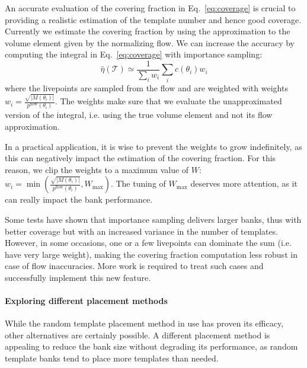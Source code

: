 \documentclass[twocolumn,showpacs,preprintnumbers,nofootinbib,prd,
superscriptaddress,10pt]{revtex4-2}
\begin{document}
An accurate evaluation of the covering fraction in Eq.~\eqref{eq:coverage} is crucial to providing a realistic estimation of the template number and hence good coverage.
Currently we estimate the covering fraction by using the approximation to the volume element given by the normalizing flow.
We can increase the accuracy by computing the integral in  Eq.~\eqref{eq:coverage} with importance sampling:
\begin{equation}\label{eq:coverage_estimate_IS}
	\hat{\eta}(\mathcal{T}) \simeq \frac{1}{\sum_i w_i} \sum_i c(\theta_i) w_i 
\end{equation}
where the livepoints are sampled from the flow and are weighted with weights $w_i = \frac{\sqrt{|M(\theta_i)|}}{p^\text{flow}(\theta_i)}$.
The weights make sure that we evaluate the unapproximated version of the integral, i.e. using the true volume element and not its flow approximation.

In a practical application, it is wise to prevent the weights to grow indefinitely, as this can negatively impact the estimation of the covering fraction. For this reason, we clip the weights to a maximum value of $W$: ${w_i = \min\left(\frac{\sqrt{|M(\theta_i)|}}{p^\text{flow}(\theta_i)}, W_\text{max} \right)}$. The tuning of $W_\text{max}$ deserves more attention, as it can really impact the bank performance.

Some tests have shown that importance sampling delivers larger banks, thus with better coverage but with an increased variance in the number of templates. However, in some occasions, one or a few livepoints can dominate the sum (i.e. have very large weight), making the covering fraction computation less robust in case of flow inaccuracies.
More work is required to treat such cases and successfully implement this new feature.


\paragraph{Exploring different placement methods}

While the random template placement method in use has proven its efficacy, other alternatives are certainly possible. A different placement method is appealing to reduce the bank size without degrading its performance, as random template banks tend to place more templates than needed.
\end{document}
